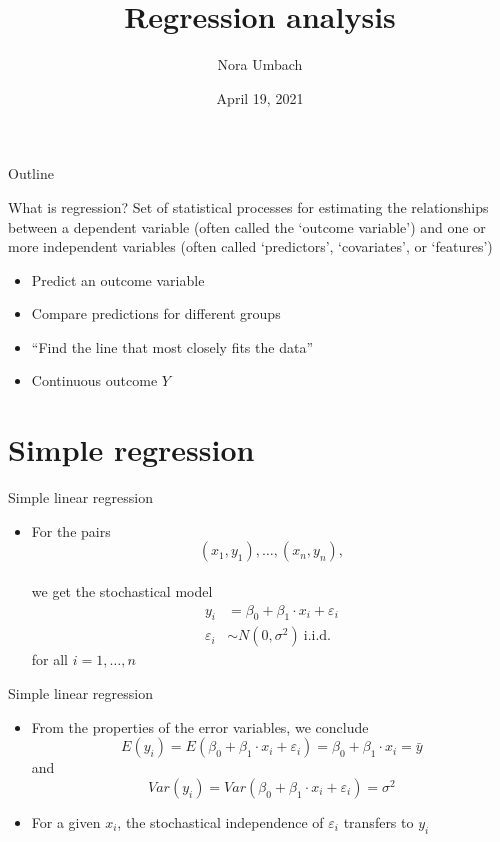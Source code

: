 \documentclass{beamer}
\title{Regression analysis}
\author{Nora Umbach%
}
\date{April 19, 2021}
\begin{document}
\begin{frame}{}
\thispagestyle{empty}
\titlepage
\end{frame}

\begin{frame}{Outline}
\tableofcontents
\end{frame}


\begin{frame}{What is regression?}
  \pause
  Set of statistical processes for estimating the relationships between a
  dependent variable (often called the `outcome variable') and one or more
  independent variables (often called `predictors', `covariates', or
  `features')
  \pause
\vfill
  \begin{itemize}
    \item Predict an outcome variable
    \item Compare predictions for different groups
    \item ``Find the line that most closely fits the data''
    \item Continuous outcome $Y$
  \end{itemize}
\end{frame}

\section{Simple regression}

\begin{frame}{Simple linear regression}
  \begin{itemize}
    \item For the pairs
      \[
        (x_1, y_1), \ldots, (x_n, y_n),
      \]\\[2ex]
    we get the stochastical model
      \begin{align*}
        y_i & = \beta_0 + \beta_1 \cdot x_i + \varepsilon_i\\
        \varepsilon_i & \sim N(0, \sigma^2)~\text{i.i.d.}
      \end{align*}
for all $i = 1, \dots, n$
  \end{itemize}
\end{frame}

\begin{frame}{Simple linear regression}
  \begin{itemize}
    \item From the properties of the error variables, we conclude
\[
  E(y_i) = E(\beta_0 + \beta_1 \cdot x_i + \varepsilon_i) =
  \beta_0 + \beta_1 \cdot x_i = \bar{y}
\]
and
\[
  Var(y_i) = Var(\beta_0 + \beta_1 \cdot x_i + \varepsilon_i) = \sigma^2
\]
\item For a given $x_i$, the stochastical independence of $\varepsilon_i$
  transfers to $y_i$\\[2ex]
  \end{itemize}
\end{frame}
\end{document}
